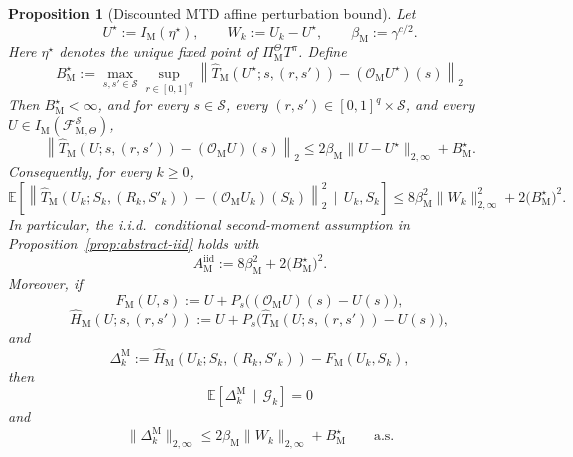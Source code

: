 \documentclass{article}
\newtheorem{proposition}[theorem]{Proposition}
\newcommand{\X}{\mathcal{S}}
\begin{document}
\begin{proposition}[Discounted MTD affine perturbation bound]
\label{prop:mtd-perturbation}
Let
\begin{equation}
U^\star := I_{\mathrm M}(\eta^\star), \qquad W_k:=U_k-U^\star, \qquad \beta_{\mathrm M} := \gamma^{c/2}.
\end{equation}
Here $\eta^\star$ denotes the unique fixed point of $\Pi_{\mathrm M}^{\Theta}T^\pi$. Define
\begin{equation}
B_{\mathrm M}^\star := \max_{s,s'\in \X} \sup_{r\in[0,1]^q} \left\lVert \widehat T_{\mathrm M}(U^\star;s,(r,s'))-(\mathcal O_{\mathrm M}U^\star)(s) \right\rVert_2
\end{equation}
Then $B_{\mathrm M}^\star<\infty$, and for every $s\in\X$, every $(r,s')\in[0,1]^q\times\X$, and every $U\in I_{\mathrm M}(\mathcal F^{\X}_{\mathrm M,\Theta})$,
\begin{equation}
\left\lVert \widehat T_{\mathrm M}(U;s,(r,s'))-(\mathcal O_{\mathrm M}U)(s) \right\rVert_2 \le 2\beta_{\mathrm M}\lVert U-U^\star \rVert_{2,\infty}+B_{\mathrm M}^\star.
\end{equation}
Consequently, for every $k\ge 0$,
\begin{equation}\label{eq:2ndmoment-mtd}
\mathbb E\left[ \left\lVert \widehat T_{\mathrm M}(U_k;S_k,(R_k,S'_k))-(\mathcal O_{\mathrm M}U_k)(S_k) \right\rVert_2^2 \,\mid\, U_k,S_k \right] \le 8\beta_{\mathrm M}^2\lVert W_k \rVert_{2,\infty}^2+2\bigl(B_{\mathrm M}^\star\bigr)^2.
\end{equation}
In particular, the i.i.d.\ conditional second-moment assumption in Proposition~\ref{prop:abstract-iid} holds with
\begin{equation}
A_{\mathrm M}^{\mathrm{iid}}:=8\beta_{\mathrm M}^2+2\bigl(B_{\mathrm M}^\star\bigr)^2.
\end{equation}
Moreover, if
\begin{equation}
F_{\mathrm M}(U,s) := U + P_s\bigl((\mathcal O_{\mathrm M}U)(s)-U(s)\bigr),
\end{equation}
\begin{equation}
\widehat H_{\mathrm M}(U;s,(r, s')) := U + P_s\bigl(\widehat T_{\mathrm M}(U;s,(r,s'))-U(s)\bigr),
\end{equation}
and
\begin{equation}
\Delta_k^{\mathrm M} := \widehat H_{\mathrm M}(U_k;S_k,(R_k,S'_k))-F_{\mathrm M}(U_k,S_k),
\end{equation}
then
\begin{equation}
\mathbb E\left[\Delta_k^{\mathrm M}\,\mid\,\mathcal G_k\right]=0
\end{equation}
and
\begin{equation}
\lVert \Delta_k^{\mathrm M} \rVert_{2,\infty} \le 2\beta_{\mathrm M}\lVert W_k \rVert_{2,\infty}+B_{\mathrm M}^\star \qquad\text{a.s.}
\end{equation}
\end{proposition}
\end{document}
